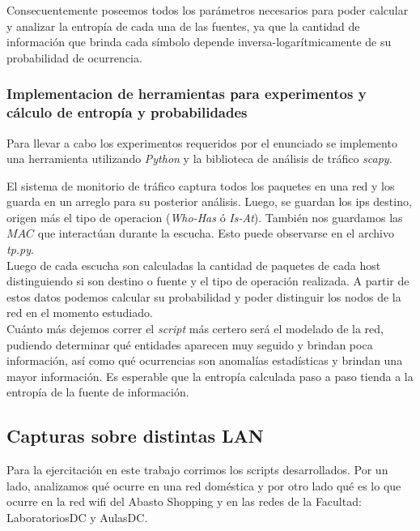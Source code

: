 Consecuentemente poseemos todos los parámetros necesarios para poder calcular y analizar la entropía de cada una de las fuentes,
ya que la cantidad de información que brinda cada símbolo depende inversa-logarítmicamente de su probabilidad de ocurrencia.\\

\subsubsection{Implementacion de herramientas para experimentos y cálculo de entropía y probabilidades}
Para llevar a cabo los experimentos requeridos por el enunciado se implemento una herramienta utilizando \emph{Python} y la biblioteca de 
análisis de tráfico \emph{scapy}.


El sistema de monitorio de tráfico captura todos los paquetes en una red y los guarda en un arreglo para su posterior análisis.
Luego, se guardan los ips destino, origen más el tipo de operacion (\emph{Who-Has} ó \emph{Is-At}). También nos guardamos las $MAC$ que interactúan
durante la escucha. Esto puede observarse en el archivo \emph{tp.py}.\\


Luego de cada escucha son calculadas la cantidad de paquetes de cada host distinguiendo si son destino o fuente y el tipo de operación realizada.
A partir de estos datos podemos calcular su probabilidad y poder distinguir los nodos de la red en el momento estudiado.\\

Cuánto más dejemos correr el \emph{script} más certero será el modelado de la red, pudiendo determinar qué entidades aparecen 
muy seguido y brindan poca información, así como qué ocurrencias son anomalías estadísticas y brindan una mayor información. 
Es esperable que la entropía calculada paso a paso tienda a la entropía de la fuente de información.

\subsection{Capturas sobre distintas LAN}
Para la ejercitación en este trabajo corrimos los scripts desarrollados. Por un lado, analizamos
qué ocurre en una red doméstica y por otro lado qué es lo que ocurre en la red wifi del Abasto Shopping y en las redes de la Facultad: 
LaboratoriosDC y AulasDC.\\

